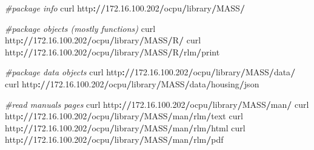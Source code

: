 \documentclass[]{book}
\newenvironment{Shaded}{\begin{snugshade}}{\end{snugshade}}
\newcommand{\FloatTok}[1]{\textcolor[rgb]{0.00,0.00,0.81}{#1}}
\newcommand{\CommentTok}[1]{\textcolor[rgb]{0.56,0.35,0.01}{\textit{#1}}}
\newcommand{\OperatorTok}[1]{\textcolor[rgb]{0.81,0.36,0.00}{\textbf{#1}}}
\newcommand{\ErrorTok}[1]{\textcolor[rgb]{0.64,0.00,0.00}{\textbf{#1}}}
\newcommand{\NormalTok}[1]{#1}
\begin{document}
\begin{Shaded}
\begin{Highlighting}[]
\CommentTok{#package info}
\NormalTok{curl http}\OperatorTok{:}\ErrorTok{//}\FloatTok{172.16}\NormalTok{.}\FloatTok{100.202}\OperatorTok{/}\NormalTok{ocpu}\OperatorTok{/}\NormalTok{library}\OperatorTok{/}\NormalTok{MASS}\OperatorTok{/}

\CommentTok{#package objects (mostly functions)}
\NormalTok{curl http}\OperatorTok{:}\ErrorTok{//}\FloatTok{172.16}\NormalTok{.}\FloatTok{100.202}\OperatorTok{/}\NormalTok{ocpu}\OperatorTok{/}\NormalTok{library}\OperatorTok{/}\NormalTok{MASS}\OperatorTok{/}\NormalTok{R}\OperatorTok{/}
\NormalTok{curl http}\OperatorTok{:}\ErrorTok{//}\FloatTok{172.16}\NormalTok{.}\FloatTok{100.202}\OperatorTok{/}\NormalTok{ocpu}\OperatorTok{/}\NormalTok{library}\OperatorTok{/}\NormalTok{MASS}\OperatorTok{/}\NormalTok{R}\OperatorTok{/}\NormalTok{rlm}\OperatorTok{/}\NormalTok{print}

\CommentTok{#package data objects}
\NormalTok{curl http}\OperatorTok{:}\ErrorTok{//}\FloatTok{172.16}\NormalTok{.}\FloatTok{100.202}\OperatorTok{/}\NormalTok{ocpu}\OperatorTok{/}\NormalTok{library}\OperatorTok{/}\NormalTok{MASS}\OperatorTok{/}\NormalTok{data}\OperatorTok{/}
\NormalTok{curl http}\OperatorTok{:}\ErrorTok{//}\FloatTok{172.16}\NormalTok{.}\FloatTok{100.202}\OperatorTok{/}\NormalTok{ocpu}\OperatorTok{/}\NormalTok{library}\OperatorTok{/}\NormalTok{MASS}\OperatorTok{/}\NormalTok{data}\OperatorTok{/}\NormalTok{housing}\OperatorTok{/}\NormalTok{json}

\CommentTok{#read manuals pages}
\NormalTok{curl http}\OperatorTok{:}\ErrorTok{//}\FloatTok{172.16}\NormalTok{.}\FloatTok{100.202}\OperatorTok{/}\NormalTok{ocpu}\OperatorTok{/}\NormalTok{library}\OperatorTok{/}\NormalTok{MASS}\OperatorTok{/}\NormalTok{man}\OperatorTok{/}
\NormalTok{curl http}\OperatorTok{:}\ErrorTok{//}\FloatTok{172.16}\NormalTok{.}\FloatTok{100.202}\OperatorTok{/}\NormalTok{ocpu}\OperatorTok{/}\NormalTok{library}\OperatorTok{/}\NormalTok{MASS}\OperatorTok{/}\NormalTok{man}\OperatorTok{/}\NormalTok{rlm}\OperatorTok{/}\NormalTok{text}
\NormalTok{curl http}\OperatorTok{:}\ErrorTok{//}\FloatTok{172.16}\NormalTok{.}\FloatTok{100.202}\OperatorTok{/}\NormalTok{ocpu}\OperatorTok{/}\NormalTok{library}\OperatorTok{/}\NormalTok{MASS}\OperatorTok{/}\NormalTok{man}\OperatorTok{/}\NormalTok{rlm}\OperatorTok{/}\NormalTok{html}
\NormalTok{curl http}\OperatorTok{:}\ErrorTok{//}\FloatTok{172.16}\NormalTok{.}\FloatTok{100.202}\OperatorTok{/}\NormalTok{ocpu}\OperatorTok{/}\NormalTok{library}\OperatorTok{/}\NormalTok{MASS}\OperatorTok{/}\NormalTok{man}\OperatorTok{/}\NormalTok{rlm}\OperatorTok{/}\NormalTok{pdf}


\end{Highlighting}
\end{Shaded}
\end{document}
